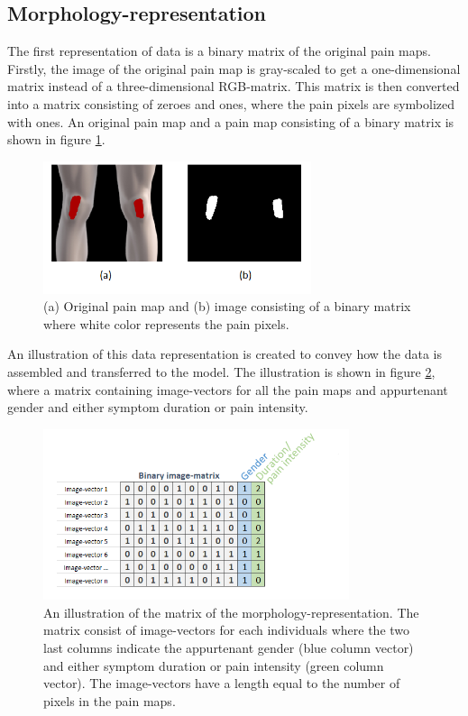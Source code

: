 \subsection{Morphology-representation} \label{sec:Morph}
The first representation of data is a binary matrix of the original pain maps.
Firstly, the image of the original pain map is gray-scaled to get a one-dimensional matrix instead of a three-dimensional RGB-matrix. This matrix is then converted into a matrix consisting of zeroes and ones, where the pain pixels are symbolized with ones. An original pain map and a pain map consisting of a binary matrix is shown in figure \ref{fig:cropbin7}.

\begin{figure} [H]
\centering
\includegraphics[width=0.7\textwidth]{figures/cropbin7}
\caption{(a) Original pain map and (b) image consisting of a binary matrix where white color represents the pain pixels.}
\label{fig:cropbin7}
\end{figure}

\noindent
An illustration of this data representation is created to convey how the data is assembled and transferred to the model. The illustration is shown in figure \ref{fig:binmatrix}, where a matrix containing image-vectors for all the pain maps and appurtenant gender and either symptom duration or pain intensity.

\begin{figure} [H]
\centering
\includegraphics[width=0.8\textwidth]{figures/binaryimagematrix}
\caption{An illustration of the matrix of the morphology-representation. The matrix consist of image-vectors for each individuals where the two last columns indicate the appurtenant gender (blue column vector) and either symptom duration or pain intensity (green column vector). The image-vectors have a length equal to the number of pixels in the pain maps.}
\label{fig:binmatrix}
\end{figure}


